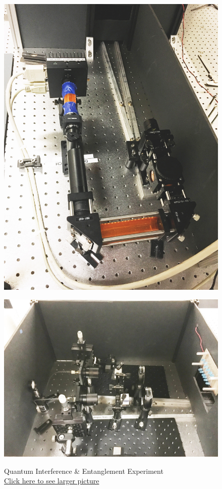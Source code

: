 \documentclass{../lab}
\begin{document}
\noindent
\begin{figure}[H]
\captionsetup{justification=centering}
  \href{http://experimentationlab.berkeley.edu/sites/default/files/images/QIE_0613_Crop.jpg}{\includegraphics[width=\linewidth,keepaspectratio]{images/QIE_0613_Crop.jpg}}
  \caption{Quantum Interference \& Entanglement Experiment \\ \href{http://experimentationlab.berkeley.edu/sites/default/files/images/QIE_0613_Crop.jpg}{Click here to see larger picture}}
  \label{fig:QIE_0613_Crop.jpg}
\endminipage\hfill
{}
  \href{http://experimentationlab.berkeley.edu/sites/default/files/images/QIE_0615.jpg}{\includegraphics[width=\linewidth,keepaspectratio]{images/QIE_0615.jpg}}

\end{figure}
\end{document}
